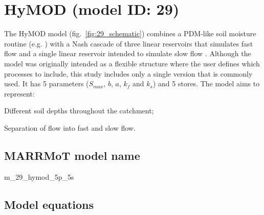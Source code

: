 \section{HyMOD (model ID: 29)}
The HyMOD model (fig.~\ref{fig:29_schematic}) combines a PDM-like soil moisture routine (e.g. \citet{Moore2007}) with a Nash cascade of three linear reservoirs that simulates fast flow and a single linear reservoir intended to simulate slow flow \citep{Wagener2001,Boyle2001}. Although the model was originally intended as a flexible structure where the user defines which processes to include, this study includes only a single version that is commonly used. It has 5 parameters ($S_{max}$, $b$, $a$, $k_f$ and $k_s$) and 5 stores. The model aims to represent:

\begin{itemizecompact}
\item Different soil depths throughout the catchment;
\item Separation of flow into fast and slow flow.
\end{itemizecompact}

\subsection{MARRMoT model name}
m\_29\_hymod\_5p\_5s \\

\subsection{Model equations}

